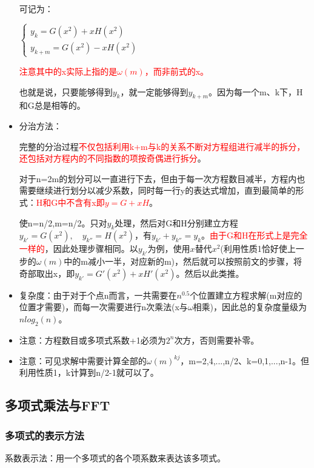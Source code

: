 \documentclass[UTF8]{article}%
\begin{document}
\begin{itemize}
    可记为：

    $\left\{\begin{array}{l}
    y_k=G(x^2)+xH(x^2) \\ 
    y_{k+m}=G(x^2)-xH(x^2)
    \end{array}\right.$

    \textcolor{red}{注意其中的x实际上指的是$\omega(m)$，而非前式的x。}
    
    也就是说，只要能够得到$y_k$，就一定能够得到$y_{k+m}$。因为每一个m、k下，H和G总是相等的。

    \item 分治方法：
    
    完整的分治过程\textcolor{red}{不仅包括利用k+m与k的关系不断对方程组进行减半的拆分，还包括对方程内的不同指数的项按奇偶进行拆分}。
    
    对于n=2m的划分可以一直进行下去，但由于每一次方程数目减半，方程内也需要继续进行划分以减少系数，同时每一行y的表达式增加，直到最简单的形式：\textcolor{red}{H和G中不含有x即$y=G+xH$}。
    
    使n=n/2,m=n/2。只对$y_k$处理，然后对G和H分别建立方程$y_{k'}=G(x^2),\quad y_{k''}=H(x^2)$，有$y_{k'}+y_{k''}=y_k$。\textcolor{red}{由于G和H在形式上是完全一样的}，因此处理步骤相同。以$y_{k'}$为例，使用$x$替代$x^2$(利用性质1恰好使上一步的$\omega(m)$中的m减小一半，对应新的m)，然后就可以按照前文的步骤，将奇部取出x，即$y_{k'}=G'(x^2)+xH'(x^2)$。然后以此类推。

    \item 复杂度：由于对于个点n而言，一共需要在$n^{0.5}$个位置建立方程求解(m对应的位置才需要)，而每一次需要进行n次乘法(x与$\omega$相乘)，因此总的复杂度量级为$nlog_2(n)$。
    \item 注意：方程数目或多项式系数+1必须为$2^n$次方，否则需要补零。
    \item 注意：可见求解中需要计算全部的$\omega(m)^{kj}$，m=2,4,...,n/2、k=0,1,...,n-1。但利用性质1，k计算到n/2-1就可以了。
\end{itemize}

\subsection{多项式乘法与FFT}

\subsubsection{多项式的表示方法}

系数表示法：用一个多项式的各个项系数来表达该多项式。
\end{document}
